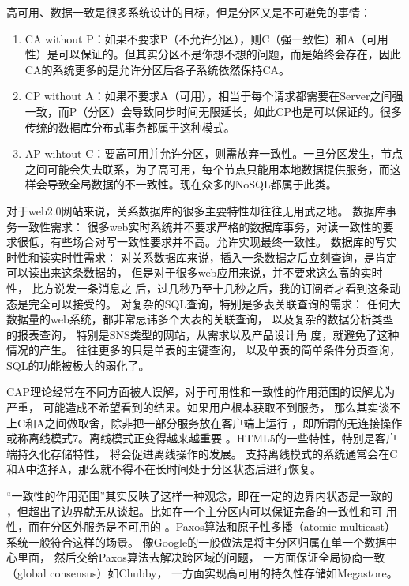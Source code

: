 高可用、数据一致是很多系统设计的目标，但是分区又是不可避免的事情：
\begin{enumerate}
	\item CA without P：如果不要求P（不允许分区），则C（强一致性）和A（可用性）是可以保证的。但其实分区不是你想不想的问题，而是始终会存在，因此CA的系统更多的是允许分区后各子系统依然保持CA。
\item 	CP without A：如果不要求A（可用），相当于每个请求都需要在Server之间强一致，而P（分区）会导致同步时间无限延长，如此CP也是可以保证的。很多传统的数据库分布式事务都属于这种模式。
\item 	AP wihtout C：要高可用并允许分区，则需放弃一致性。一旦分区发生，节点之间可能会失去联系，为了高可用，每个节点只能用本地数据提供服务，而这样会导致全局数据的不一致性。现在众多的NoSQL都属于此类。
\end{enumerate}

对于web2.0网站来说，关系数据库的很多主要特性却往往无用武之地。
数据库事务一致性需求：
很多web实时系统并不要求严格的数据库事务，对读一致性的要求很低，有些场合对写一致性要求并不高。允许实现最终一致性。
数据库的写实时性和读实时性需求：
对关系数据库来说，插入一条数据之后立刻查询，是肯定可以读出来这条数据的，
但是对于很多web应用来说，并不要求这么高的实时性，
比方说发一条消息之 后，过几秒乃至十几秒之后，我的订阅者才看到这条动态是完全可以接受的。
对复杂的SQL查询，特别是多表关联查询的需求：
任何大数据量的web系统，都非常忌讳多个大表的关联查询，
以及复杂的数据分析类型的报表查询，
特别是SNS类型的网站，从需求以及产品设计角 度，就避免了这种情况的产生。
往往更多的只是单表的主键查询，
以及单表的简单条件分页查询，SQL的功能被极大的弱化了。       


CAP理论经常在不同方面被人误解，对于可用性和一致性的作用范围的误解尤为严重，
可能造成不希望看到的结果。如果用户根本获取不到服务，
那么其实谈不上C和A之间做取舍，除非把一部分服务放在客户端上运行
，即所谓的无连接操作或称离线模式7。离线模式正变得越来越重要
。HTML5的一些特性，特别是客户端持久化存储特性，
将会促进离线操作的发展。
支持离线模式的系统通常会在C和A中选择A，那么就不得不在长时间处于分区状态后进行恢复。

“一致性的作用范围”其实反映了这样一种观念，即在一定的边界内状态是一致的
，但超出了边界就无从谈起。比如在一个主分区内可以保证完备的一致性和可
用性，而在分区外服务是不可用的
。Paxos算法和原子性多播（atomic multicast）系统一般符合这样的场景。
像Google的一般做法是将主分区归属在单一个数据中心里面，
然后交给Paxos算法去解决跨区域的问题，
一方面保证全局协商一致（global consensus）如Chubby，
一方面实现高可用的持久性存储如Megastore。

